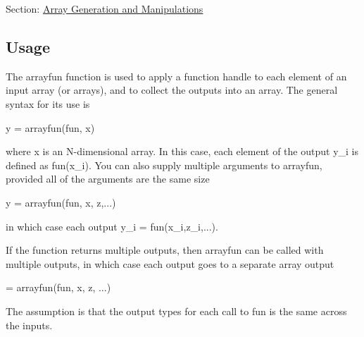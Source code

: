 Section\-: \hyperlink{sec_array}{Array Generation and Manipulations} \hypertarget{vtkwidgets_vtkxyplotwidget_Usage}{}\subsection{Usage}\label{vtkwidgets_vtkxyplotwidget_Usage}
The {\ttfamily arrayfun} function is used to apply a function handle to each element of an input array (or arrays), and to collect the outputs into an array. The general syntax for its use is \begin{DoxyVerb}   y = arrayfun(fun, x)
\end{DoxyVerb}
 where {\ttfamily x} is an N-\/dimensional array. In this case, each element of the output {\ttfamily y\-\_\-i} is defined as {\ttfamily fun(x\-\_\-i)}. You can also supply multiple arguments to {\ttfamily arrayfun}, provided all of the arguments are the same size \begin{DoxyVerb}   y = arrayfun(fun, x, z,...)
\end{DoxyVerb}
 in which case each output {\ttfamily y\-\_\-i = fun(x\-\_\-i,z\-\_\-i,...)}.

If the function returns multiple outputs, then {\ttfamily arrayfun} can be called with multiple outputs, in which case each output goes to a separate array output \begin{DoxyVerb}   [y1,y2,...] = arrayfun(fun, x, z, ...)
\end{DoxyVerb}
 The assumption is that the output types for each call to {\ttfamily fun} is the same across the inputs.


